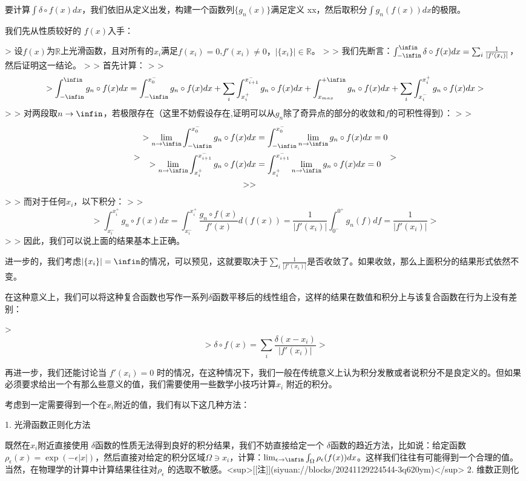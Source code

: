 \documentclass[lang=cn,10pt,newtx,bibend=biber,device=pad]{elegantbook}
\begin{document}
要计算$\int\delta\circ f(x) dx$，我们依旧从定义出发，构建一个函数列$\{g_n(x)\}$满足定义 xx，然后取积分$\int g_n(f(x)) dx$的极限。

我们先从性质较好的 $f(x)$入手：

> 设$f(x)$为$\mathbb{R}$上光滑函数，且对所有的$x_i$满足$f(x_i) = 0$,$f'(x_i) \neq 0，|\{x_i\}| \in\mathbb{R}$。
>
> 我们先断言：$\int_{-\infin}^{\infin} \delta\circ f(x) dx = \sum_i \frac{1}{|f'(x_i)|}$，然后证明这一结论。
>
> 首先计算：
>
> $$
> \int_{-\infin}^{\infin} g_n\circ f(x) dx = \int_{-\infin}^{x^-_0} g_n\circ f(x) dx+\sum_i \int_{x^+_i}^{x^-_{i+1}} g_n\circ f(x) dx + \int^{+\infin}_{x_{max}} g_n\circ f(x) dx + \sum_i \int_{x_i^-}^{x_i^+} g_n\circ f(x) dx
> $$
>
> 对两段取$n\rightarrow \infin$，若极限存在（这里不妨假设存在,证明可以从$g_n$除了奇异点的部分的收敛和$f$的可积性得到）：
>
> $$
> \begin{align*}
> \lim_{n\rightarrow\infin}\int_{-\infin}^{x^-_0} g_n\circ f(x) dx &= \int_{-\infin}^{x^-_0}\lim_{n\rightarrow\infin}g_n\circ f(x) dx = 0\\
> \lim_{n\rightarrow\infin}\int_{x^+_i}^{x^-_{i+1}} g_n\circ f(x) dx &= \int_{x^+_i}^{x^-_{i+1}} \lim_{n\rightarrow\infin} g_n\circ f(x) dx = 0\\
>
> \end{align*}
> $$
>
> 而对于任何$x_i$，以下积分：
>
> $$
> \int_{x_i^-}^{x_i^+} g_n\circ f(x) dx = \int_{x_i^-}^{x_i^+} \frac{g_n\circ f(x)}{f'(x)}d(f(x))=\frac{1}{|f'(x_i)|}\int_{0^-}^{0^+} g_n(f) df = \frac{1}{|f'(x_i)|}
> $$
>
> 因此，我们可以说上面的结果基本上正确。

进一步的，我们考虑$|\{x_i\}|=\infin$的情况，可以预见，这就要取决于$\sum_i\frac{1}{|f'(x_i)|}$是否收敛了。如果收敛，那么上面积分的结果形式依然不变。

在这种意义上，我们可以将这种复合函数也写作一系列$\delta$函数平移后的线性组合，这样的结果在数值和积分上与该复合函数在行为上没有差别：

> $$
> \delta\circ f(x) = \sum_i \frac{\delta(x-x_i)}{|f'(x_i)|}
> $$

再进一步，我们还能讨论当 $f'(x_i)=0$ 时的情况，在这种情况下，我们一般在传统意义上认为积分发散或者说积分不是良定义的。但如果必须要求给出一个有那么些意义的值，我们需要使用一些数学小技巧计算$x_i$ 附近的积分。

考虑到一定需要得到一个在$x_i$附近的值，我们有以下这几种方法：

1. 光滑函数正则化方法

    既然在$x_i$附近直接使用 $\delta$函数的性质无法得到良好的积分结果，我们不妨直接给定一个 $\delta$函数的趋近方法，比如说：给定函数$\rho_\epsilon(x) = \exp(-\epsilon|x|)$，然后直接对给定的积分区域$\Omega \owns x_i$，计算：$\lim_{\epsilon\rightarrow \infin} \int_{\Omega} \rho_\epsilon(f(x)) dx$。这样我们往往有可能得到一个合理的值。当然，在物理学的计算中计算结果往往对$\rho_\epsilon$ 的选取不敏感。<sup>[[注]](siyuan://blocks/20241129224544-3q620ym)</sup>
2. 维数正则化
\end{document}

